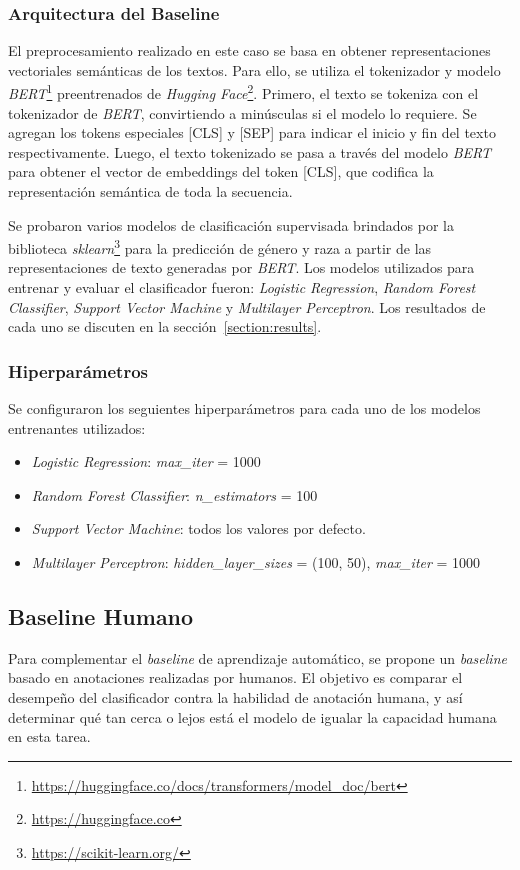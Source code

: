 \subsubsection{Arquitectura del Baseline}
El preprocesamiento realizado en este caso se basa en obtener representaciones vectoriales sem\'anticas 
de los textos. Para ello, se utiliza el tokenizador y modelo 
\emph{BERT}\footnote{\url{https://huggingface.co/docs/transformers/model_doc/bert}} preentrenados de 
\emph{Hugging Face}\footnote{\url{https://huggingface.co}}. Primero, el texto se tokeniza con el 
tokenizador de \emph{BERT}, convirtiendo a min\'usculas si el modelo lo requiere. Se agregan los 
tokens especiales [CLS] y [SEP] para indicar el inicio y fin del texto respectivamente.
Luego, el texto tokenizado se pasa a trav\'es del modelo \emph{BERT} para obtener el vector de 
embeddings del token [CLS], que codifica la representaci\'on sem\'antica de toda la secuencia. 

Se probaron varios modelos de clasificaci\'on supervisada brindados por la biblioteca 
\emph{sklearn}\footnote{\url{https://scikit-learn.org/}} para la predicci\'on de g\'enero y raza 
a partir de las representaciones de texto generadas por \emph{BERT}. Los modelos utilizados para 
entrenar y evaluar el clasificador fueron: \emph{Logistic Regression}, 
\emph{Random Forest Classifier}, \emph{Support Vector Machine} y \emph{Multilayer Perceptron}.
Los resultados de cada uno se discuten en la secci\'on~\ref{section:results}.

\subsubsection{Hiperpar\'ametros}
Se configuraron los seguientes hiperpar\'ametros para cada uno de los modelos entrenantes utilizados:
\begin{itemize}
    \item \emph{Logistic Regression}: \emph{max\_iter} = 1000
    \item \emph{Random Forest Classifier}: \emph{n\_estimators} = 100
    \item \emph{Support Vector Machine}: todos los valores por defecto.
    \item \emph{Multilayer Perceptron}: \emph{hidden\_layer\_sizes} = (100, 50), \emph{max\_iter} = 1000
\end{itemize}


\subsection{Baseline Humano}\label{subsection:human_baseline}
Para complementar el \emph{baseline} de aprendizaje autom\'atico, se propone un \emph{baseline} 
basado en anotaciones realizadas por humanos. El objetivo es comparar el desempe\~no del 
clasificador contra la habilidad de anotaci\'on humana, y as\'i 
determinar qu\'e tan cerca o lejos est\'a el modelo de igualar la capacidad humana en 
esta tarea.

